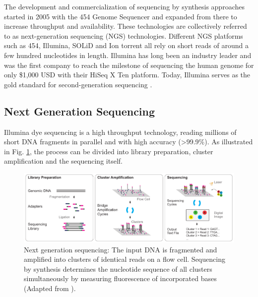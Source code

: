 The development and commercialization of sequencing by synthesis approaches started in 2005 with the 454 Genome Sequencer and expanded from there to increase throughput and availability. 
These technologies are collectively referred to as next-generation sequencing (NGS) technologies.
Different NGS platforms such as 454, Illumina, SOLiD and Ion torrent all rely on short reads of around a few hundred nucleotides in length. 
Illumina has long been an industry leader and was the first company to reach the milestone of sequencing the human genome for only \$1,000 USD with their HiSeq X Ten platform. Today, Illumina serves as the gold standard for second-generation sequencing \cite{Dijk2014}. 

\subsection{Next Generation Sequencing}
\label{subsec:intro:ngs}

Illumina dye sequencing is a high throughput technology, reading millions of short DNA fragments in parallel and with high accuracy (>99.9\%).
As illustrated in Fig. \ref{fig:intro:sbs}, the process can be divided into library preparation, cluster amplification and the sequencing itself.

\begin{figure}[h]
	\centering
	\includegraphics[width=1.0\textwidth]{figures/intro/sbs.pdf}
	\captionsetup{format=plain}
	\caption[Sequencing by synthesis]{Next generation sequencing: The input DNA is fragmented and amplified into clusters of identical reads on a flow cell. Sequencing by synthesis determines the nucleotide sequence of all clusters simultaneously by measuring fluorescence of incorporated bases (Adapted from \cite{illumina2021}).}
	\label{fig:intro:sbs}
\end{figure}

